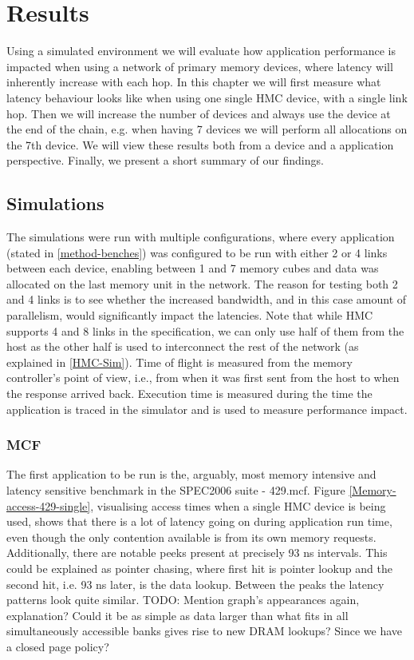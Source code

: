 \chapter{Results}
Using a simulated environment we will evaluate how application performance is impacted when using a network of primary memory devices, where latency will inherently increase with each hop. In this chapter we will first measure what latency behaviour looks like when using one single HMC device, with a single link hop. Then we will increase the number of devices and always use the device at the end of the chain, e.g. when having 7 devices we will perform all allocations on the 7th device. We will view these results both from a device and a application perspective. Finally, we present a short summary of our findings.

\section{Simulations}
The simulations were run with multiple configurations, where every application (stated in \ref{method-benches}) was configured to be run with either 2 or 4 links between each device, enabling between 1 and 7 memory cubes and data was allocated on the last memory unit in the network. The reason for testing both 2 and 4 links is to see whether the increased bandwidth, and in this case amount of parallelism, would significantly impact the latencies. Note that while HMC supports 4 and 8 links in the specification, we can only  use half of them from the host as the other half is used to interconnect the rest of the network (as explained in \ref{HMC-Sim}). Time of flight is measured from the memory controller's point of view, i.e., from when it was first sent from the host to when the response arrived back. Execution time is measured during the time the application is traced in the simulator and is used to measure performance impact.
\bigskip

\subsection{MCF}
The first application to be run is the, arguably, most memory intensive and latency sensitive benchmark in the SPEC2006 suite - 429.mcf. Figure \ref{Memory-access-429-single}, visualising access times when a single HMC device is being used, shows that there is a lot of latency going on during application run time, even though the only contention available is from its own memory requests. Additionally, there are notable peeks present at precisely 93 ns intervals. This could be explained as pointer chasing, where first hit is pointer lookup and the second hit, i.e. 93 ns later, is the data lookup. Between the peaks the latency patterns look quite similar. TODO: Mention graph's appearances again, explanation? Could it be as simple as data larger than what fits in all simultaneously accessible banks gives rise to new DRAM lookups? Since we have a closed page policy?
\bigskip

